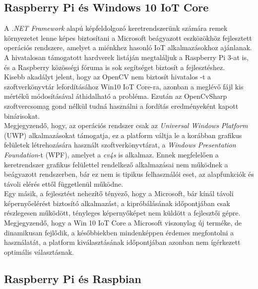 \subsection{Raspberry Pi és Windows 10 IoT Core} \label{rpi-win10iot}

A \emph{.NET Framework} alapú képfeldolgozó keretrendszerünk számára remek környezetet lenne képes biztosítani a Microsoft beágyazott eszközökhöz fejlesztett operációs rendszere, amelyet a miénkhez hasonló IoT alkalmazásokhoz ajánlanak. A hivatalosan támogatott hardverek listáján megtaláljuk a Raspberry Pi 3-at is, és a Raspberry közösségi fóruma is sok segítséget biztosít a fejlesztéshez. \\
Kisebb akadályt jelent, hogy az OpenCV nem biztosít hivatalos -t a szoftverkönyvtár lefordításához Win10 IoT Core-ra, azonban a meglévő fájl kis mértékű módosításával áthidalható a probléma. \cite{win10-compile} Ezután az OpenCvSharp szoftvercsomag gond nélkül tudná használni a fordítás eredményeként kapott binárisokat. \\
Megjegyzendő, hogy, az operációs rendszer csak az \emph{Universal Windows Platform} (UWP) alkalmazásokat támogatja, ez a platform váltja le a korábban grafikus felületek létrehozására használt szoftverkönyvtárat, a \emph{Windows Presentation Foundation}-t (WPF), amelyet a \emph{cv4s} is alkalmaz. Ennek megfelelően a keretrendszer grafikus felülettel rendelkező alkalmazásai nem működnek a beágyazott rendszerben, bár ez nem is tipikus felhasználói eset, az alapfunkciók és távoli elérés ettől függetlenül működne.\\
Egy másik, a fejlesztést nehezítő tényező, hogy a Microsoft, bár kínál távoli képernyőelérést biztosító alkalmazást, a kipróbálásának időpontjában csak részlegesen működött, tényleges képernyőképet nem küldött a fejlesztői gépre. Megjegyzendő, hogy a Win 10 IoT Core a Microsoft viszonylag új terméke, de dinamikusan fejlődik, a későbbiekben mindenképpen érdemes megfontolni a használatát, a platform kiválasztásának időpontjában azonban nem ígérkezett optimális választásnak.

\subsection{Raspberry Pi és Raspbian}

